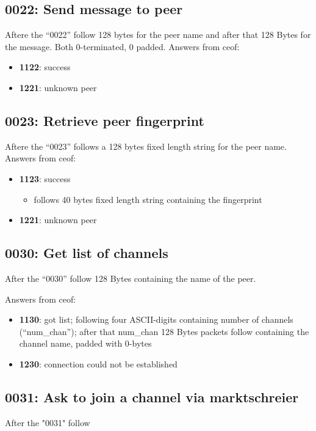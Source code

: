 \documentclass[12pt,a4paper]{article}
\begin{document}
\subsection{0022: Send message to peer}
Aftere the "`0022"' follow 128 bytes for the peer name
and after that 128 Bytes for the message.
Both 0-terminated, 0 padded.
Answers from ceof:
\begin{itemize}
\item \textbf{1122}: success
\item \textbf{1221}: unknown peer
\end{itemize}
\subsection{0023: Retrieve peer fingerprint}
Aftere the "`0023"' follows a 128 bytes fixed length string for the peer name.
Answers from ceof:
\begin{itemize}
\item \textbf{1123}: success
\begin{itemize}
\item follows 40 bytes fixed length string containing the fingerprint
\end{itemize}
\item \textbf{1221}: unknown peer
\end{itemize}
\subsection{0030: Get list of channels}
After the "`0030"' follow 128 Bytes containing the 
name of the peer.

Answers from ceof:

\begin{itemize}
\item \textbf{1130}: got list; following four ASCII-digits containing
number of channels ("`num\_chan"'); after that  num\_chan 128 Bytes packets
follow containing the channel name, padded with 0-bytes
\item \textbf{1230}: connection could not be established
\end{itemize}
\subsection{0031: Ask to join a channel via marktschreier}
After the "0031" follow
\end{document}
